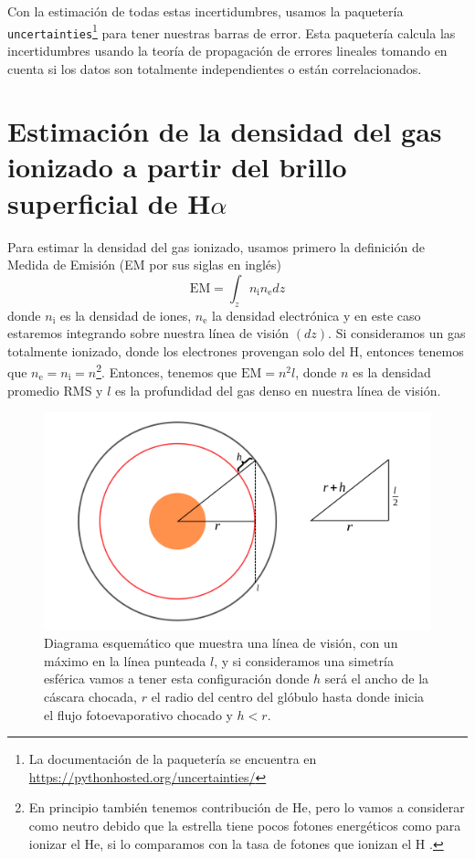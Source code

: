 \documentclass{book}
\begin{document}
Con la estimación de todas estas incertidumbres, usamos la paquetería
\verb|uncertainties|\footnote{La documentación de la paquetería se
  encuentra en \url{https://pythonhosted.org/uncertainties/}} para
tener nuestras barras de error. Esta paquetería calcula las
incertidumbres usando la teoría de propagación de errores lineales
tomando en cuenta si los datos son totalmente independientes o están
correlacionados.

\section{\boldmath Estimación de la densidad del gas ionizado a partir
  del brillo superficial de H$\alpha$}\label{Sec : estimacion de densidad}

Para estimar la densidad del gas ionizado, usamos primero la
definición de Medida de Emisión (EM por sus siglas en inglés)
\begin{equation}
\mathrm{EM}=\int_z n_\mathrm{i} n_\mathrm{e}dz    
\end{equation}
donde $n_\mathrm{i}$ es la densidad de iones, $n_\mathrm{e}$ la
densidad electrónica y en este caso estaremos integrando sobre nuestra
línea de visión $(dz)$. Si consideramos un gas totalmente ionizado,
donde los electrones provengan solo del H, entonces tenemos que
$n_\mathrm{e}=n_\mathrm{i}=n$\footnote{En principio también tenemos
  contribución de He, pero lo vamos a considerar como neutro debido
  que la estrella tiene pocos fotones energéticos como para ionizar el
  He, si lo comparamos con la tasa de fotones que ionizan el H
  \citep{Palmira:2020}.}. Entonces, tenemos que $\mathrm{EM}=n^2l$,
donde $n$ es la densidad promedio RMS y $l$ es la profundidad del gas
denso en nuestra línea de visión.
 
\begin{figure}[htb]
    \centering    \includegraphics[width=\textwidth]{artesanales/ImgFi01-4.pdf}
    \caption{Diagrama esquemático que muestra una línea de visión, con
      un máximo en la línea punteada $l$, y si consideramos una
      simetría esférica vamos a tener esta configuración donde $h$
      será el ancho de la cáscara chocada, $r$ el radio del centro del
      glóbulo hasta donde inicia el flujo fotoevaporativo chocado y
      $h<r$.}
    \label{fig:EM}
\end{figure}
\end{document}
